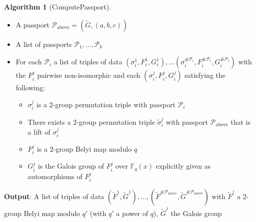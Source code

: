 \documentclass{dcthesis}
\newcommand{\wt}[1]{\widetilde{#1}}
\newcommand{\FF}{\mathbb{F}}
\numberwithin{equation}{section}
\theoremstyle{definition}
\newtheorem{alg}[equation]{Algorithm}
\theoremstyle{remark}
\begin{document}
{{{\begin{alg}[ComputePassport]
\begin{itemize}
        \item
          A passport
          $\mathcal{P}_{\text{above}} =
          (\wt{G},(a,b,c))$
        \item
          A list of passports
          $\mathcal{P}_1,
          \dots,
          \mathcal{P}_k$
        \item
          For each
          $\mathcal{P}_i$
          a list of triples of data
          $(\sigma_i^1,F_i^1,G_i^1),
          \dots
          (\sigma_i^{\#\mathcal{P}_i},
          F_i^{\#\mathcal{P}_i},
          G_i^{\#\mathcal{P}_i})$
          with the $F_i^j$
          pairwise non-isomorphic
          and
          each
          $(\sigma_i^j,F_i^j,G_i^j)$
          satisfying the following:
          \begin{itemize}
            \item
              $\sigma_i^j$ is a $2$-group
              permutation triple with passport
              $\mathcal{P}_i$
            \item
              There exists
              a $2$-group
              permutation triple
              $\wt{\sigma}_i^j$
              with passport
              $\mathcal{P}_\text{above}$
              that is a lift
              of $\sigma_i^j$
            \item
              $F_i^j$ is a $2$-group Belyi map
              modulo $q$
            \item
              $G_i^j$ is the Galois group of
              $F_i^j$ over $\FF_q(x)$
              explicitly given as
              automorphisms of $F_i^j$
          \end{itemize}
      \end{itemize}
      \textbf{Output}:
      A list of triples of data
      $(\wt{F}^1,\wt{G}^1),
      \dots,
      (\wt{F}^{\#\mathcal{P}_\text{above}},
      \wt{G}^{\#\mathcal{P}_\text{above}})$
      with
      $\wt{F}^j$
      a $2$-group Belyi map modulo $q'$
      (with $q'$ a power of $q$),
      $\wt{G}^j$
      the Galois group

\end{alg}}}}
\end{document}
